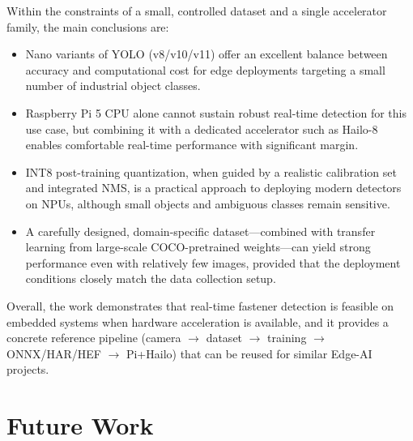 \documentclass[12pt,a4paper]{report}
\begin{document}
Within the constraints of a small, controlled dataset and a single accelerator family,
the main conclusions are:

\begin{itemize}[leftmargin=1.5em]
    \item Nano variants of YOLO (v8/v10/v11) offer an excellent balance between accuracy and computational
    cost for edge deployments targeting a small number of industrial object classes.

    \item Raspberry Pi 5 CPU alone cannot sustain robust real-time detection for this use case,
    but combining it with a dedicated accelerator such as Hailo-8 enables comfortable real-time
    performance with significant margin.

    \item INT8 post-training quantization, when guided by a realistic calibration set and integrated
    NMS, is a practical approach to deploying modern detectors on NPUs, although small objects
    and ambiguous classes remain sensitive.

    \item A carefully designed, domain-specific dataset—combined with transfer learning from large-scale
    COCO-pretrained weights—can yield strong performance even with relatively few images,
    provided that the deployment conditions closely match the data collection setup.
\end{itemize}

Overall, the work demonstrates that real-time fastener detection is feasible on embedded systems
when hardware acceleration is available, and it provides a concrete reference pipeline
(camera \(\rightarrow\) dataset \(\rightarrow\) training \(\rightarrow\) ONNX/HAR/HEF
\(\rightarrow\) Pi+Hailo) that can be reused for similar Edge-AI projects.


\chapter{Future Work}
\end{document}
